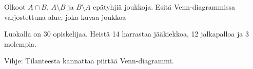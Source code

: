 \begin{tehtava}
     Olkoot $A \cap B$, $A \setminus B$ ja $B \setminus A$ epätyhjiä joukkoja. Esitä Venn-diagrammissa varjostettuna alue, joka kuvaa joukkoa
    \begin{alakohdat}
    \end{alakohdat}

%
    
\end{tehtava}



\begin{tehtava}
     Luokalla on 30 opiskelijaa. Heistä 14 harrastaa jääkiekkoa, 12 jalkapalloa ja 3 molempia. 
    \begin{alakohdat}
    \end{alakohdat}
Vihje: Tilanteesta kannattaa piirtää Venn-diagrammi.
    \begin{vastaus}
    
        \begin{alakohdat}
        \end{alakohdat} %
    \end{vastaus}
    
\end{tehtava}



